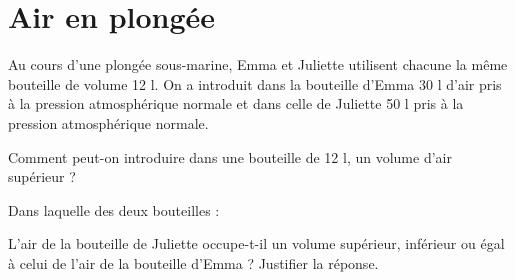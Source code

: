\section{Air en plongée}

Au cours d'une plongée sous-marine, Emma et Juliette utilisent chacune la même bouteille de volume 12 l.
On a introduit dans la bouteille d'Emma 30 l d'air pris à la pression atmosphérique normale et dans celle de Juliette 50 l pris à la pression atmosphérique normale.

\begin{questions}
	\question Comment peut-on introduire dans une bouteille de 12 l, un volume d'air supérieur ?
	\fillwithdottedlines{2.5cm}
	
	\question Dans laquelle des deux bouteilles :

	\question L'air de la bouteille de Juliette occupe-t-il un volume supérieur, inférieur ou égal à celui de l'air de la bouteille d'Emma ? Justifier la réponse.
	
	\fillwithdottedlines{3cm}
\end{questions}